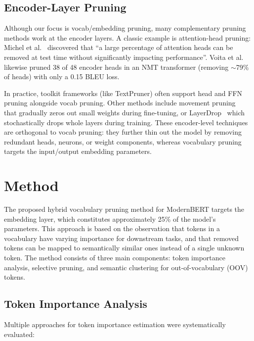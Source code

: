 \documentclass[twocolumn]{article}
\begin{document}
\subsection{Encoder-Layer Pruning}

Although our focus is vocab/embedding pruning, many complementary pruning methods work at the encoder layers. A classic example is attention-head pruning: Michel et al.~\cite{michel2019heads} discovered that ``a large percentage of attention heads can be removed at test time without significantly impacting performance''. Voita et al.~\cite{voita2019heads} likewise pruned 38 of 48 encoder heads in an NMT transformer (removing $\sim$79\% of heads) with only a 0.15 BLEU loss.

In practice, toolkit frameworks (like TextPruner) often support head and FFN pruning alongside vocab pruning. Other methods include movement pruning~\cite{sanh2020movement} that gradually zeros out small weights during fine-tuning, or LayerDrop~\cite{fan2020layerdrop} which stochastically drops whole layers during training. These encoder-level techniques are orthogonal to vocab pruning: they further thin out the model by removing redundant heads, neurons, or weight components, whereas vocabulary pruning targets the input/output embedding parameters.

\section{Method}

The proposed hybrid vocabulary pruning method for ModernBERT targets the embedding layer, which constitutes approximately 25\% of the model's parameters. This approach is based on the observation that tokens in a vocabulary have varying importance for downstream tasks, and that removed tokens can be mapped to semantically similar ones instead of a single unknown token. The method consists of three main components: token importance analysis, selective pruning, and semantic clustering for out-of-vocabulary (OOV) tokens.

\subsection{Token Importance Analysis}
Multiple approaches for token importance estimation were systematically evaluated:
\end{document}

